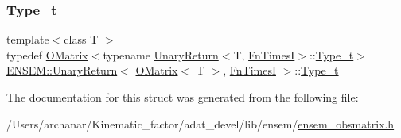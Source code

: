 \subsubsection{\texorpdfstring{Type\_t}{Type\_t}\hspace{0.1cm}{\footnotesize\ttfamily [2/2]}}
{\footnotesize\ttfamily template$<$class T $>$ \\
typedef \mbox{\hyperlink{classENSEM_1_1OMatrix}{O\+Matrix}}$<$typename \mbox{\hyperlink{structENSEM_1_1UnaryReturn}{Unary\+Return}}$<$T, \mbox{\hyperlink{structENSEM_1_1FnTimesI}{Fn\+TimesI}}$>$\+::\mbox{\hyperlink{structENSEM_1_1UnaryReturn_3_01OMatrix_3_01T_01_4_00_01FnTimesI_01_4_a823208991719b80307ceb78f0448f0de}{Type\+\_\+t}}$>$ \mbox{\hyperlink{structENSEM_1_1UnaryReturn}{E\+N\+S\+E\+M\+::\+Unary\+Return}}$<$ \mbox{\hyperlink{classENSEM_1_1OMatrix}{O\+Matrix}}$<$ T $>$, \mbox{\hyperlink{structENSEM_1_1FnTimesI}{Fn\+TimesI}} $>$\+::\mbox{\hyperlink{structENSEM_1_1UnaryReturn_3_01OMatrix_3_01T_01_4_00_01FnTimesI_01_4_a823208991719b80307ceb78f0448f0de}{Type\+\_\+t}}}



The documentation for this struct was generated from the following file\+:\begin{DoxyCompactItemize}
\item 
/\+Users/archanar/\+Kinematic\+\_\+factor/adat\+\_\+devel/lib/ensem/\mbox{\hyperlink{lib_2ensem_2ensem__obsmatrix_8h}{ensem\+\_\+obsmatrix.\+h}}\end{DoxyCompactItemize}
